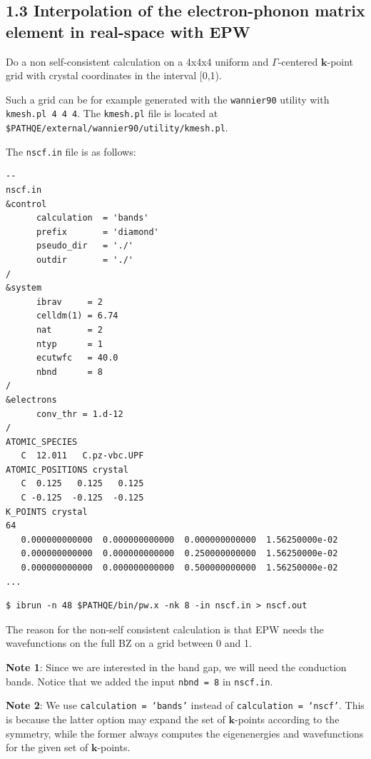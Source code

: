 \documentclass[a4paper,11pt,serif]{article}
\newcommand{\mb}[1]{\mathbf{#1}}
\begin{document}
\subsection*{1.3 Interpolation of the electron-phonon matrix element in real-space with EPW}
\vspace{0.5cm}
\action Do a non self-consistent calculation on a 4x4x4 uniform and $\Gamma$-centered $\mb{k}$-point grid with crystal coordinates in the interval [0,1).


Such a grid can be for example generated with the \texttt{wannier90} utility with \texttt{kmesh.pl 4 4 4}.
%
The \texttt{kmesh.pl} file is located at \texttt{\$PATHQE/external/wannier90/utility/kmesh.pl}.


The \texttt{nscf.in} file is as follows:
\begin{scriptsize}
 \begin{Verbatim}[frame=single]
--                                                                                                nscf.in
&control
      calculation  = 'bands'
      prefix       = 'diamond'
      pseudo_dir   = './'
      outdir       = './'
/
&system
      ibrav     = 2
      celldm(1) = 6.74
      nat       = 2
      ntyp      = 1
      ecutwfc   = 40.0
      nbnd      = 8
/
&electrons
      conv_thr = 1.d-12
/
ATOMIC_SPECIES
   C  12.011   C.pz-vbc.UPF
ATOMIC_POSITIONS crystal
   C  0.125   0.125   0.125
   C -0.125  -0.125  -0.125
K_POINTS crystal
64
   0.000000000000  0.000000000000  0.000000000000  1.56250000e-02
   0.000000000000  0.000000000000  0.250000000000  1.56250000e-02
   0.000000000000  0.000000000000  0.500000000000  1.56250000e-02
...
\end{Verbatim}
\end{scriptsize}

\begin{verbatim}
$ ibrun -n 48 $PATHQE/bin/pw.x -nk 8 -in nscf.in > nscf.out
\end{verbatim}

The reason for the non-self consistent calculation is that EPW needs the wavefunctions on the full BZ on a grid between 0 and 1.

\vspace{0.5cm}
\begin{footnotesize}
   \textbf{Note 1}: Since we are interested in the band gap, we will need the conduction bands. Notice that we added the input \texttt{nbnd = 8} in \texttt{nscf.in}.

   \textbf{Note 2}: We use \texttt{calculation  = `bands'} instead of \texttt{calculation  = `nscf'}. This is because the latter option may expand the set of $\mb{k}$-points according to the symmetry, while the former always computes the eigenenergies and wavefunctions for the given set of $\mb{k}$-points.
\end{footnotesize}
\end{document}
